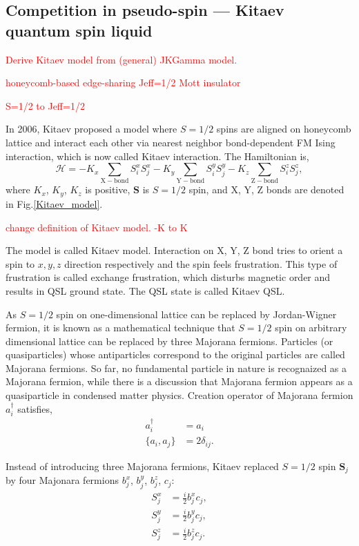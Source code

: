 \subsection{Competition in pseudo-spin --- Kitaev quantum spin liquid}
\textcolor{red}{Derive Kitaev model from (general) JKGamma model.}

\textcolor{red}{honeycomb-based edge-sharing Jeff=1/2 Mott insulator}

\textcolor{red}{S=1/2 to Jeff=1/2}

In 2006, Kitaev proposed a model where $S = 1/2$ spins are aligned on honeycomb lattice and interact each other via nearest neighbor bond-dependent FM Ising interaction, which is now called Kitaev interaction.
The Hamiltonian is,
\begin{equation}
\mathcal{H} = -K_x\sum_\mathrm{X-bond} S^x_iS^x_j - K_y\sum_\mathrm{Y-bond} S^y_iS^y_j - K_z\sum_\mathrm{Z-bond} S^z_iS^z_j,
\label{Kitaev_H}
\end{equation}
where $K_x$, $K_y$, $K_z$ is positive, $\bm{S}$ is $S = 1/2$ spin, and X, Y, Z bonds are denoted in Fig.\ref{Kitaev_model}.

\textcolor{red}{change definition of Kitaev model. -K to K}

The model is called Kitaev model.
Interaction on X, Y, Z bond tries to orient a spin to $x, y, z$ direction respectively and the spin feels frustration.
This type of frustration is called exchange frustration, which disturbs magnetic order and results in QSL ground state.
The QSL state is called Kitaev QSL.

As $S = 1/2$ spin on one-dimensional lattice can be replaced by Jordan-Wigner fermion, it is known as a mathematical technique that $S = 1/2$ spin on arbitrary dimensional lattice can be replaced by three Majorana fermions.
Particles (or quasiparticles) whose antiparticles correspond to the original particles are called Majorana fermions.
So far, no fundamental particle in nature is recognaized as a Majorana fermion, while there is a discussion that Majorana fermion appears as a quasiparticle in condensed matter physics.
Creation operator of Majorana fermion $a^\dag_i$ satisfies,
\begin{align}
   a^\dag_i &= a_i\\
  \{a_i, a_j\} &= 2\delta_{ij}.
\end{align}

Instead of introducing three Majorana fermions, Kitaev replaced $S = 1/2$ spin $\bm{S}_j$ by four Majonara fermions $b^x_j$, $b^y_j$, $b^z_j$, $c_j$:
\begin{align}
  S^x_j &= \frac{i}{2}b^x_jc_j,\\
  S^y_j &= \frac{i}{2}b^y_jc_j,\\
  S^z_j &= \frac{i}{2}b^z_jc_j.
\end{align}

